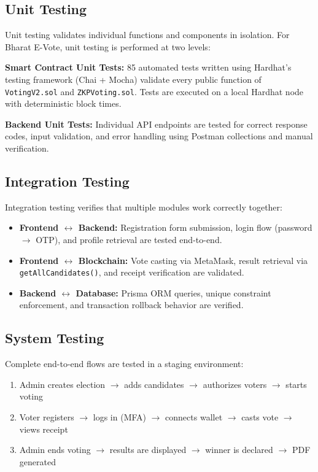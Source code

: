 \documentclass[oneside,a4paper,12pt]{book}
\begin{document}
\subsection{Unit Testing}
Unit testing validates individual functions and components in isolation. For Bharat E-Vote, unit testing is performed at two levels:

\textbf{Smart Contract Unit Tests:} 85 automated tests written using Hardhat's testing framework (Chai + Mocha) validate every public function of \texttt{VotingV2.sol} and \texttt{ZKPVoting.sol}. Tests are executed on a local Hardhat node with deterministic block times.

\textbf{Backend Unit Tests:} Individual API endpoints are tested for correct response codes, input validation, and error handling using Postman collections and manual verification.

\subsection{Integration Testing}
Integration testing verifies that multiple modules work correctly together:
\begin{itemize}[leftmargin=1.5cm]
    \item \textbf{Frontend $\leftrightarrow$ Backend:} Registration form submission, login flow (password $\rightarrow$ OTP), and profile retrieval are tested end-to-end.
    \item \textbf{Frontend $\leftrightarrow$ Blockchain:} Vote casting via MetaMask, result retrieval via \texttt{getAllCandidates()}, and receipt verification are validated.
    \item \textbf{Backend $\leftrightarrow$ Database:} Prisma ORM queries, unique constraint enforcement, and transaction rollback behavior are verified.
\end{itemize}

\subsection{System Testing}
Complete end-to-end flows are tested in a staging environment:
\begin{enumerate}[leftmargin=1.5cm]
    \item Admin creates election $\rightarrow$ adds candidates $\rightarrow$ authorizes voters $\rightarrow$ starts voting
    \item Voter registers $\rightarrow$ logs in (MFA) $\rightarrow$ connects wallet $\rightarrow$ casts vote $\rightarrow$ views receipt
    \item Admin ends voting $\rightarrow$ results are displayed $\rightarrow$ winner is declared $\rightarrow$ PDF generated
\end{enumerate}
\end{document}
